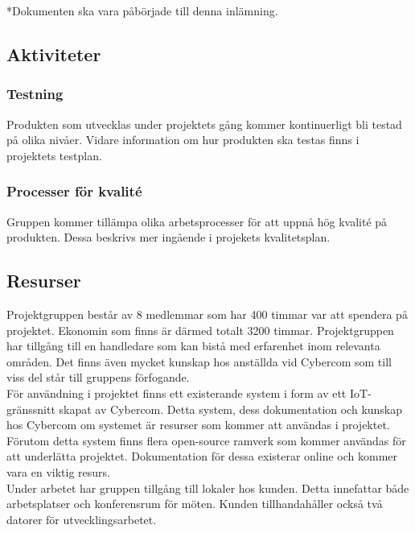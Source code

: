 *Dokumenten ska vara påbörjade till denna inlämning.

\subsection{Aktiviteter}

\subsubsection*{Testning}
Produkten som utvecklas under projektets gång kommer kontinuerligt bli testad på olika nivåer. Vidare information om hur produkten ska testas finns i projektets testplan\cite{bib-testplan}.

\subsubsection*{Processer för kvalité}
Gruppen kommer tillämpa olika arbetsprocesser för att uppnå hög kvalité på produkten. Dessa beskrivs mer ingående i projekets kvalitetsplan\cite{bib-kvalitetsplan}.

\subsection{Resurser}
Projektgruppen består av 8 medlemmar som har 400 timmar var att spendera på projektet. Ekonomin som finns är därmed totalt 3200 timmar. Projektgruppen har tillgång till en handledare som kan bistå med erfarenhet inom relevanta områden. Det finns även mycket kunskap hos anställda vid Cybercom som till viss del står till gruppens förfogande.\\

För användning i projektet finns ett existerande system i form av ett IoT-gränssnitt skapat av Cybercom. Detta system, dess dokumentation och kunskap hos Cybercom om systemet är resurser som kommer att användas i projektet. Förutom detta system finns flera open-source ramverk som kommer användas för att underlätta projektet. Dokumentation för dessa existerar online och kommer vara en viktig resurs.\\

Under arbetet har gruppen tillgång till lokaler hos kunden. Detta innefattar både arbetsplatser och konferensrum för möten. Kunden tillhandahåller också två datorer för utvecklingsarbetet. \\

\pagebreak
